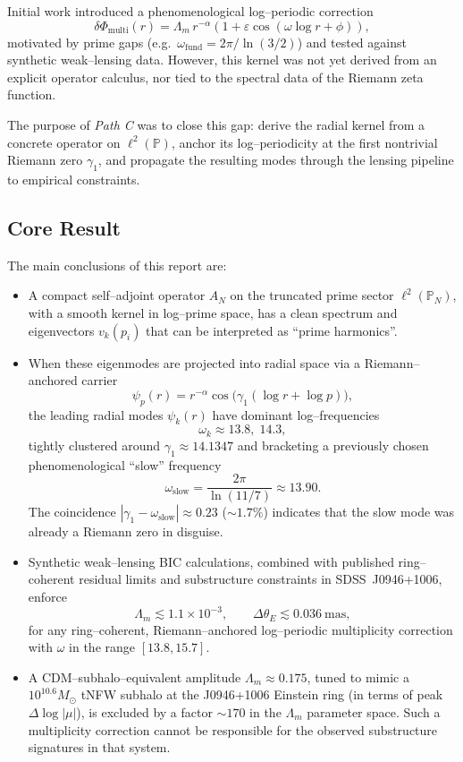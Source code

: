 \documentclass[11pt]{article}
\begin{document}
Initial work introduced a phenomenological log--periodic correction
\[
\delta\Phi_{\text{multi}}(r)
= \Lambda_m\, r^{-\alpha}\left(1 + \varepsilon \cos(\omega \log r + \phi)\right),
\]
motivated by prime gaps (e.g.\ $\omega_{\mathrm{fund}} = 2\pi / \ln(3/2)$) and tested against synthetic weak--lensing data. However, this kernel was not yet derived from an explicit operator calculus, nor tied to the spectral data of the Riemann zeta function.

The purpose of \emph{Path C} was to close this gap: derive the radial kernel from a concrete operator on $\ell^2(\mathbb{P})$, anchor its log--periodicity at the first nontrivial Riemann zero $\gamma_1$, and propagate the resulting modes through the lensing pipeline to empirical constraints.

\subsection{Core Result}

The main conclusions of this report are:

\begin{itemize}[leftmargin=*]
  \item A compact self--adjoint operator $A_N$ on the truncated prime sector $\ell^2(\mathbb{P}_N)$, with a smooth kernel in log--prime space, has a clean spectrum and eigenvectors $v_k(p_i)$ that can be interpreted as ``prime harmonics''.

  \item When these eigenmodes are projected into radial space via a Riemann--anchored carrier
  \[
  \psi_p(r) = r^{-\alpha} \cos\big(\gamma_1(\log r + \log p)\big),
  \]
  the leading radial modes $\psi_k(r)$ have dominant log--frequencies
  \[
  \omega_k \approx 13.8,\; 14.3,
  \]
  tightly clustered around $\gamma_1 \approx 14.1347$ and bracketing a previously chosen phenomenological ``slow'' frequency
  \[
  \omega_{\text{slow}} = \frac{2\pi}{\ln(11/7)} \approx 13.90.
  \]
  The coincidence $|\gamma_1 - \omega_{\text{slow}}| \approx 0.23$ ($\sim 1.7\%$) indicates that the slow mode was already a Riemann zero in disguise.

  \item Synthetic weak--lensing BIC calculations, combined with published ring--coherent residual limits and substructure constraints in SDSS~J0946+1006, enforce
  \[
  \Lambda_m \lesssim 1.1\times 10^{-3},\qquad
  \Delta\theta_E \lesssim 0.036~\mathrm{mas},
  \]
  for any ring--coherent, Riemann--anchored log--periodic multiplicity correction with $\omega$ in the range $[13.8, 15.7]$.

  \item A CDM--subhalo--equivalent amplitude $\Lambda_m \approx 0.175$, tuned to mimic a $10^{10.6}M_\odot$ tNFW subhalo at the J0946+1006 Einstein ring (in terms of peak $\Delta\log|\mu|$), is excluded by a factor $\sim 170$ in the $\Lambda_m$ parameter space. Such a multiplicity correction cannot be responsible for the observed substructure signatures in that system.

\end{itemize}
\end{document}

